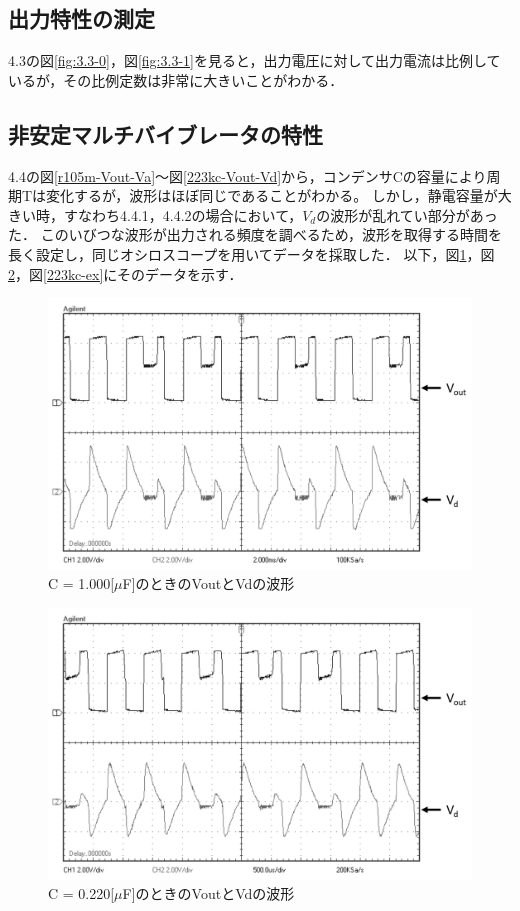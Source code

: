 \documentclass[10pt, a4j, dvipdfmx]{jarticle}
\begin{document}
\subsection{出力特性の測定}
4.3の図\ref{fig:3.3-0}，図\ref{fig:3.3-1}を見ると，出力電圧に対して出力電流は比例しているが，その比例定数は非常に大きいことがわかる．

\subsection{非安定マルチバイブレータの特性}
4.4の図\ref{r105m-Vout-Va}～図\ref{223kc-Vout-Vd}から，コンデンサCの容量により周期Tは変化するが，波形はほぼ同じであることがわかる。
しかし，静電容量が大きい時，すなわち4.4.1，4.4.2の場合において，$V_d$の波形が乱れてい部分があった．
このいびつな波形が出力される頻度を調べるため，波形を取得する時間を長く設定し，同じオシロスコープを用いてデータを採取した．
以下，図\ref{r105m-ex}，図\ref{224j-ex}，図\ref{223kc-ex}にそのデータを示す．
\begin{figure}[H]
    \centering
    \includegraphics[width=\hsize]{images/r105m-ex.png}
    \caption{C = 1.000[$\mu$F]のときのVoutとVdの波形}
	\label{r105m-ex}
\end{figure}
\begin{figure}[H]
    \centering
    \includegraphics[width=\hsize]{images/224j-ex.png}
    \caption{C = 0.220[$\mu$F]のときのVoutとVdの波形}
	\label{224j-ex}
\end{figure}
\end{document}
